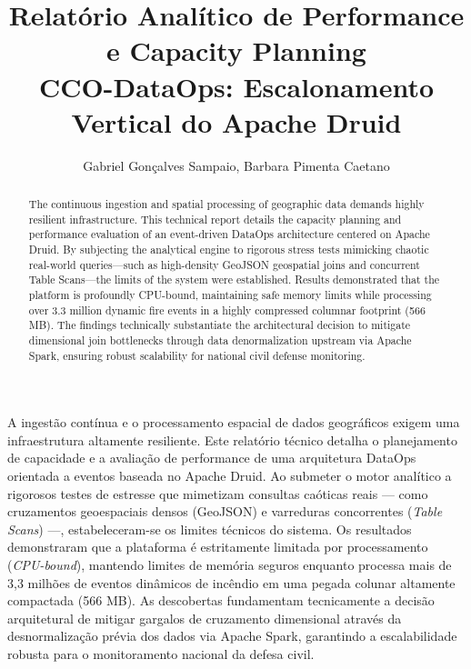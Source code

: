 \documentclass[12pt]{article}
\title{Relatório Analítico de Performance e Capacity Planning\\
  CCO-DataOps: Escalonamento Vertical do Apache Druid}
\author{Gabriel Gonçalves Sampaio\inst{1}, Barbara Pimenta Caetano\inst{1}}
\begin{document}
\maketitle

\begin{abstract}
  The continuous ingestion and spatial processing of geographic data demands highly resilient infrastructure. This technical report details the capacity planning and performance evaluation of an event-driven DataOps architecture centered on Apache Druid. By subjecting the analytical engine to rigorous stress tests mimicking chaotic real-world queries—such as high-density GeoJSON geospatial joins and concurrent Table Scans—the limits of the system were established. Results demonstrated that the platform is profoundly CPU-bound, maintaining safe memory limits while processing over 3.3 million dynamic fire events in a highly compressed columnar footprint (566 MB). The findings technically substantiate the architectural decision to mitigate dimensional join bottlenecks through data denormalization upstream via Apache Spark, ensuring robust scalability for national civil defense monitoring.
\end{abstract}

\begin{resumo}
  A ingestão contínua e o processamento espacial de dados geográficos exigem uma infraestrutura altamente resiliente. Este relatório técnico detalha o planejamento de capacidade e a avaliação de performance de uma arquitetura DataOps orientada a eventos baseada no Apache Druid. Ao submeter o motor analítico a rigorosos testes de estresse que mimetizam consultas caóticas reais — como cruzamentos geoespaciais densos (GeoJSON) e varreduras concorrentes (\textit{Table Scans}) —, estabeleceram-se os limites técnicos do sistema. Os resultados demonstraram que a plataforma é estritamente limitada por processamento (\textit{CPU-bound}), mantendo limites de memória seguros enquanto processa mais de 3,3 milhões de eventos dinâmicos de incêndio em uma pegada colunar altamente compactada (566 MB). As descobertas fundamentam tecnicamente a decisão arquitetural de mitigar gargalos de cruzamento dimensional através da desnormalização prévia dos dados via Apache Spark, garantindo a escalabilidade robusta para o monitoramento nacional da defesa civil.
\end{resumo}







\end{document}
